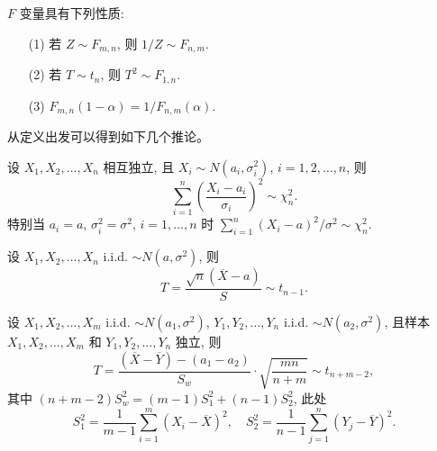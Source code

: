 \begin{proposition} \label{prop:f_distribution_properties}
$F$ 变量具有下列性质:
\begin{enumerate}
    \item[(1)] 若 $Z \sim F_{m,n}$, 则 $1/Z \sim F_{n,m}$.
    \item[(2)] 若 $T \sim t_n$, 则 $T^2 \sim F_{1,n}$.
    \item[(3)] $F_{m,n}(1-\alpha) = 1/F_{n,m}(\alpha)$.
\end{enumerate}
\end{proposition}
从定义出发可以得到如下几个推论。
\begin{corollary} \label{cor:standardized_chi_squared}
设 $X_1, X_2, \ldots, X_n$ 相互独立, 且 $X_i \sim N(a_i, \sigma_i^2)$, $i=1,2,\ldots,n$, 则
\[
\sum_{i=1}^n \left(\frac{X_i - a_i}{\sigma_i}\right)^2 \sim \chi_n^2.
\]
特别当 $a_i = a$, $\sigma_i^2 = \sigma^2$, $i=1, \ldots, n$ 时 $\sum_{i=1}^n (X_i - a)^2/\sigma^2 \sim \chi_n^2$.
\end{corollary}

\begin{corollary} \label{cor:t_statistic_one_sample}
设 $X_1, X_2, \ldots, X_n$ i.i.d. $\sim N(a,\sigma^2)$, 则
\[
T = \frac{\sqrt{n}(\overline{X} - a)}{S} \sim t_{n-1}.
\]
\end{corollary}

\begin{corollary} \label{cor:t_statistic_two_sample}
设 $X_1, X_2, \ldots, X_m$ i.i.d. $\sim N(a_1,\sigma^2)$, $Y_1, Y_2, \ldots, Y_n$ i.i.d. $\sim N(a_2,\sigma^2)$, 且样本 $X_1, X_2, \ldots, X_m$ 和 $Y_1, Y_2, \ldots, Y_n$ 独立, 则
\[
T = \frac{(\overline{X} - \overline{Y}) - (a_1 - a_2)}{S_w} \cdot \sqrt{\frac{mn}{n+m}} \sim t_{n+m-2},
\]
其中 $(n+m-2)S_w^2 = (m-1)S_1^2 + (n-1)S_2^2$, 此处
\[
S_1^2 = \frac{1}{m-1}\sum_{i=1}^m (X_i - \overline{X})^2, \quad S_2^2 = \frac{1}{n-1}\sum_{j=1}^n (Y_j - \overline{Y})^2.
\]
\end{corollary}

